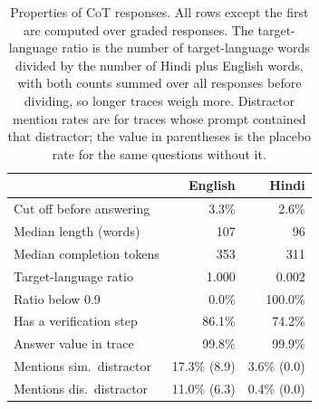 \begin{table}[t]
\centering
\small
\setlength{\tabcolsep}{4pt}
\begin{tabular}{lrr}
\toprule
 & English & Hindi \\
\midrule
Cut off before answering & 3.3\% & 2.6\% \\
Median length (words) & 107 & 96 \\
Median completion tokens & 353 & 311 \\
Target-language ratio & 1.000 & 0.002 \\
Ratio below 0.9 & 0.0\% & 100.0\% \\
Has a verification step & 86.1\% & 74.2\% \\
Answer value in trace & 99.8\% & 99.9\% \\
Mentions sim.\ distractor & 17.3\% (8.9) & 3.6\% (0.0) \\
Mentions dis.\ distractor & 11.0\% (6.3) & 0.4\% (0.0) \\
\bottomrule
\end{tabular}
\caption{Properties of CoT responses. All rows except the first are computed over graded responses. The target-language ratio is the number of target-language words divided by the number of Hindi plus English words, with both counts summed over all responses before dividing, so longer traces weigh more. Distractor mention rates are for traces whose prompt contained that distractor; the value in parentheses is the placebo rate for the same questions without it.}
\label{tab:trace}
\end{table}
